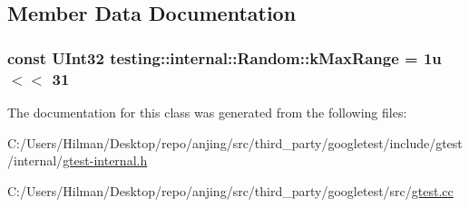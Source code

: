 \subsection{Member Data Documentation}
\hypertarget{classtesting_1_1internal_1_1_random_a36d72dd7063d0b5338f229e75382fdd2}{}
\subsubsection[{k\+Max\+Range}]{\setlength{\rightskip}{0pt plus 5cm}const {\bf U\+Int32} testing\+::internal\+::\+Random\+::k\+Max\+Range = 1u $<$$<$ 31\hspace{0.3cm}{\ttfamily [static]}}\label{classtesting_1_1internal_1_1_random_a36d72dd7063d0b5338f229e75382fdd2}


The documentation for this class was generated from the following files\+:\begin{DoxyCompactItemize}
\item 
C\+:/\+Users/\+Hilman/\+Desktop/repo/anjing/src/third\+\_\+party/googletest/include/gtest/internal/\hyperlink{gtest-internal_8h}{gtest-\/internal.\+h}\item 
C\+:/\+Users/\+Hilman/\+Desktop/repo/anjing/src/third\+\_\+party/googletest/src/\hyperlink{gtest_8cc}{gtest.\+cc}\end{DoxyCompactItemize}

